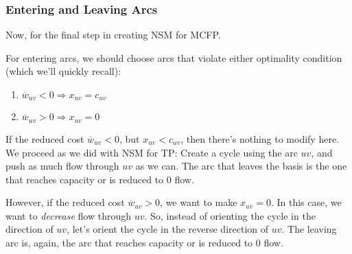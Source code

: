 \subsubsection{Entering and Leaving Arcs}
Now, for the final step in creating NSM for MCFP.

For entering arcs, we should choose arcs that violate either optimality condition (which we'll quickly recall):
\begin{enumerate}
    \item $\overline{w}_{uv} < 0 \Rightarrow x_{uv} = c_{uv}$
    \item $\overline{w}_{uv} > 0 \Rightarrow x_{uv} = 0$
\end{enumerate}

If the reduced cost $\overline{w}_{uv} < 0$, but $x_{uv} < c_{uv}$, then there's nothing to modify here.
We proceed as we did with NSM for TP: Create a cycle using the arc $uv$, and push as much flow through $uv$ as we can. 
The arc that leaves the basis is the one that reaches capacity or is reduced to $0$ flow.

However, if the reduced cost $\overline{w}_{uv} > 0$, we want to make $x_{uv} = 0$.
In this case, we want to \textit{decrease} flow through $uv$.
So, instead of orienting the cycle in the direction of $uv$, let's orient the cycle in the reverse direction of $uv$. The leaving arc is, again, the arc that reaches capacity or is reduced to $0$ flow.

